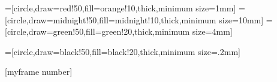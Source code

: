 
\makeatletter

{
	\hfill%
}


\newcommand\derivative[5]{%
	\tkzDefPointByFct[draw](#1) \tkzGetPoint{start}
	\tkzDefPointByFct[draw](#2) \tkzGetPoint{end}
	\draw[thin,|-|,yshift=-3pt] (start) -- node[black,fill=white,#5] {#3}(start-|end);  
	\draw[thin,|-|,xshift=3pt] (start-|end) -- node[black,fill=white,right] {#4}(end); 
}

=[circle,draw=red!50,fill=orange!10,thick,minimum size=1mm]
=[circle,draw=midnight!50,fill=midnight!10,thick,minimum size=10mm]
=[circle,draw=green!50,fill=green!20,thick,minimum size=4mm]

=[circle,draw=black!50,fill=black!20,thick,minimum size=.2mm]

[myframe number]
\makeatother